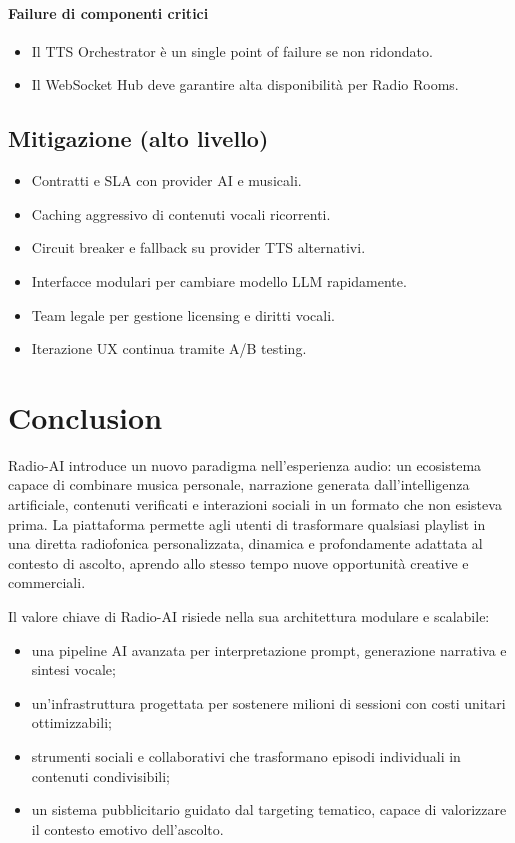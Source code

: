 \documentclass[11pt,a4paper]{article}
\begin{document}
\paragraph{Failure di componenti critici}
\begin{itemize}
    \item Il TTS Orchestrator è un single point of failure se non ridondato.
    \item Il WebSocket Hub deve garantire alta disponibilità per Radio Rooms.
\end{itemize}


\subsection{Mitigazione (alto livello)}

\begin{itemize}
    \item Contratti e SLA con provider AI e musicali.
    \item Caching aggressivo di contenuti vocali ricorrenti.
    \item Circuit breaker e fallback su provider TTS alternativi.
    \item Interfacce modulari per cambiare modello LLM rapidamente.
    \item Team legale per gestione licensing e diritti vocali.
    \item Iterazione UX continua tramite A/B testing.
\end{itemize}
\section{Conclusion}

Radio-AI introduce un nuovo paradigma nell’esperienza audio: un ecosistema capace di combinare musica personale, narrazione generata dall’intelligenza artificiale, contenuti verificati e interazioni sociali in un formato che non esisteva prima.  
La piattaforma permette agli utenti di trasformare qualsiasi playlist in una diretta radiofonica personalizzata, dinamica e profondamente adattata al contesto di ascolto, aprendo allo stesso tempo nuove opportunità creative e commerciali.

Il valore chiave di Radio-AI risiede nella sua architettura modulare e scalabile:
\begin{itemize}
    \item una pipeline AI avanzata per interpretazione prompt, generazione narrativa e sintesi vocale;
    \item un’infrastruttura progettata per sostenere milioni di sessioni con costi unitari ottimizzabili;
    \item strumenti sociali e collaborativi che trasformano episodi individuali in contenuti condivisibili;
    \item un sistema pubblicitario guidato dal targeting tematico, capace di valorizzare il contesto emotivo dell’ascolto.
\end{itemize}
\end{document}
